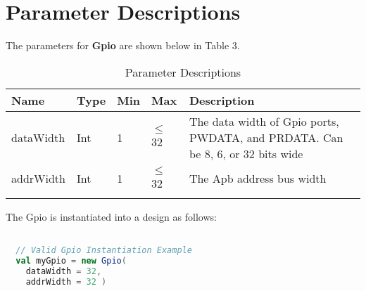 
\section{Parameter Descriptions}

The parameters for \textbf{Gpio} are shown below in
Table 3.

\renewcommand*{\arraystretch}{1.4}
\begin{longtable}[H]{
    | p{}
    | p{}
    | p{}
    | p{}
    | p{} |
  }
  \hline
  \textbf{Name} &
  \textbf{Type} &
  \textbf{Min}  &
  \textbf{Max}  &
  \textbf{Description}            \\ \hline \hline

  dataWidth   &
  Int       &
  1         &
  $\leq$ 32          &
  The data width of Gpio ports, PWDATA, and PRDATA. Can be 8, 6, or 32 bits wide \\ \hline

  addrWidth     &
  Int           &
  1             &
  $\leq$ 32       &
  The Apb address bus width  \\ \hline

  \caption{Parameter Descriptions}\label{table:params}
\end{longtable}

The Gpio is instantiated into a design as follows:

\begin{lstlisting}[language=Scala]

  // Valid Gpio Instantiation Example
  val myGpio = new Gpio(
    dataWidth = 32, 
    addrWidth = 32 ) 

  \end{lstlisting}